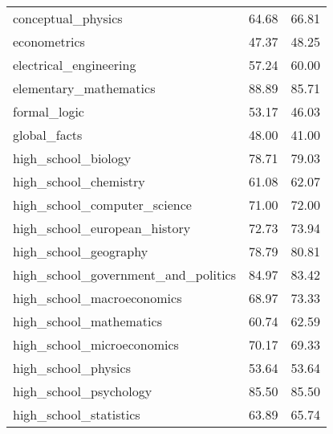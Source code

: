 \begin{table}[t]
\begin{tabular}{L{0.35}C{0.20}C{0.20}}
        conceptual\_physics                     & 64.68                    & 66.81                      \\
        econometrics                            & 47.37                    & 48.25                      \\
        electrical\_engineering                 & 57.24                    & 60.00                      \\
        elementary\_mathematics                 & 88.89                    & 85.71                      \\
        formal\_logic                           & 53.17                    & 46.03                      \\
        global\_facts                           & 48.00                    & 41.00                      \\
        high\_school\_biology                   & 78.71                    & 79.03                      \\
        high\_school\_chemistry                 & 61.08                    & 62.07                      \\
        high\_school\_computer\_science         & 71.00                    & 72.00                      \\
        high\_school\_european\_history         & 72.73                    & 73.94                      \\
        high\_school\_geography                 & 78.79                    & 80.81                      \\
        high\_school\_government\_and\_politics & 84.97                    & 83.42                      \\
        high\_school\_macroeconomics            & 68.97                    & 73.33                      \\
        high\_school\_mathematics               & 60.74                    & 62.59                      \\
        high\_school\_microeconomics            & 70.17                    & 69.33                      \\
        high\_school\_physics                   & 53.64                    & 53.64                      \\
        high\_school\_psychology                & 85.50                    & 85.50                      \\
        high\_school\_statistics                & 63.89                    & 65.74                      \\

\end{tabular}
\end{table}
